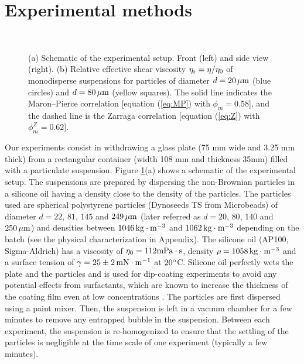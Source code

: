 \documentclass{jfm}
\begin{document}

\section{Experimental methods} \label{sec:exp}

\begin{figure}
\centering
  \\
  \caption{(a) Schematic of the experimental setup.
      Front (left) and side view (right).
      (b) Relative effective shear viscosity $\eta_{\rm r}=\eta/\eta_0$ of monodisperse suspensions
      for particles of diameter $d=20\,\mu{\rm m}$ (blue circles) 
      and $d=80\,\mu{\rm m}$ (yellow squares).
      The solid line indicates the Maron–Pierce correlation [equation (\ref{eq:MP}) with $\phi_m=0.58$],
      and the dashed line is the Zarraga correlation [equation (\ref{eq:Z}) with $\phi_m^Z=0.62$].
  }
  \label{fgr:Figure_2}
\end{figure}

Our experiments consist in withdrawing a glass plate (75 mm wide and 3.25 mm thick) from a rectangular container (width 108 mm and thickness 35mm) filled with a particulate suspension. Figure \ref{fgr:Figure_2}(a) shows a schematic of the experimental setup. The suspensions are prepared by dispersing the non-Brownian particles in a silicone oil having a density close to the density of the particles. The particles used are spherical polystyrene particles (Dynoseeds TS from Microbeads) of diameter $d = 22,\, 81,\, 145$ and $249\,\mu\rm{m}$  (later referred as $d = 20,\, 80,\, 140$ and $250\,\mu\rm{m}$) and densities between $1046\, \rm{kg \cdot m^{-3}}$ and $1062\, \rm{kg\cdot m^{-3}}$ depending on the batch (see the physical characterization in Appendix). The silicone oil (AP100, Sigma-Aldrich) has a viscosity of $\eta_0 = 112 \rm{mPa \cdot s}$, density $\rho = \rm{1058 \,kg \cdot m^{-3}}$ and a surface tension of $\gamma=25 \pm 2\,{\rm mN \cdot m^{-1}}$ at $20^{\rm o}$C. Silicone oil perfectly wets the plate and the particles and is used for dip-coating experiments to avoid any potential effects from surfactants, which are known to increase the thickness of the coating film even at low concentrations \cite[][]{krechetnikov2005experimental,krechetnikov2006surfactant,rio2017withdrawing}. The particles are first dispersed using a paint mixer. Then, the suspension is left in a vacuum chamber for a few minutes to remove any entrapped bubble in the suspension. Between each experiment, the suspension is re-homogenized to ensure that the settling of the particles is negligible at the time scale of one experiment (typically a few minutes).
\end{document}
